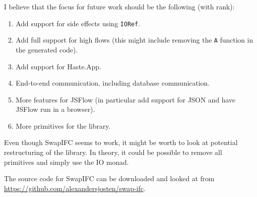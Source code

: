 I believe that the focus for future work should be the following (with rank):
\begin{enumerate}
  \item Add support for side effects using {\tt IORef}.
  \item Add full support for high flows (this might include removing the {\tt A} function in the generated code).
  \item Add support for Haste.App.
  \item End-to-end communication, including database communication.
  \item More features for JSFlow (in particular add support for JSON and have JSFlow run in a browser).
  \item More primitives for the library.
\end{enumerate}
Even though SwapIFC seems to work, it might be worth to look at potential restructuring of the library. In theory, it could be possible to remove all primitives and simply use the IO monad.

The source code for SwapIFC can be downloaded and looked at from \url{https://github.com/alexandersjosten/swap-ifc}.
